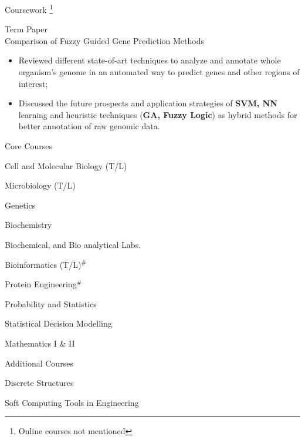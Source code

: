 \documentclass{article}
\newlength{\tabin}
\newlength{\secsep}
\newcommand{\lineunder}{\vspace*{-8pt} \\ \hspace*{-6pt} \hrulefill \\ \vspace*{-15pt}}
\newenvironment{tabbedsection}[1]{
  \begin{list}{}{
      \setlength{\itemsep}{0pt}
      \setlength{\labelsep}{0pt}
      \setlength{\labelwidth}{0pt}
      \setlength{\leftmargin}{\tabin}
      \setlength{\rightmargin}{\tabin}
      \setlength{\listparindent}{0pt}
      \setlength{\parsep}{0pt}
      \setlength{\parskip}{0pt}
      \setlength{\partopsep}{0pt}
      \setlength{\topsep}{#1}
    }
  \item[]
}{\end{list}}
\newenvironment{resume_section}[1]{
  \filbreak
  \vspace{2\secsep}
  \textsc{\large#1}
  \lineunder
  \begin{tabbedsection}{\secsep}
}{\end{tabbedsection}}
\newenvironment{resume_subsection}[2][]{
  \textbf{#2} \hfill {\footnotesize #1} \hspace*{-3.5em}
  \begin{tabbedsection}{0.5\secsep}
}{\end{tabbedsection}}
\newenvironment{subitems}{
  \renewcommand{\labelitemi}{$\cdot$}
  \begin{itemize}
      \setlength{\labelsep}{1em}
}{\end{itemize}}
\begin{document}
\begin{resume_section}{Coursework \footnote{Online courses not mentioned}}
  \begin{resume_subsection}{Term Paper \\ Comparison of Fuzzy Guided Gene Prediction Methods}
    \begin{subitems}
      \item Reviewed different state-of-art techniques to analyze and annotate whole organism's genome in an automated way to predict genes and other regions of interest;
      \item Discussed the future prospects and application strategies of \textbf{SVM, NN} learning and heuristic techniques (\textbf{GA, Fuzzy Logic}) as hybrid methods for better annotation of raw genomic data.\\
    \end{subitems}
    \end{resume_subsection}

\begin{resume_subsection}{Core Courses}
\vspace*{-8pt}
    \begin{subitems}
        \begin{multicols}{2}
        \item Cell and Molecular Biology (T/L)
        \item Microbiology (T/L)
        \item Genetics
        \item Biochemistry
        \item Biochemical, and Bio analytical Labs.
        \item Bioinformatics (T/L)$^{\#}$
        \item Protein Engineering$^{\#}$
        \item Probability and Statistics
        \item Statistical Decision Modelling
        \item Mathematics I \& II
        \end{multicols}
    \end{subitems}
\end{resume_subsection}

\begin{resume_subsection}{Additional Courses}
\vspace*{-8pt}
    \begin{subitems}
        \begin{multicols}{2}
        \item Discrete Structures
        \item Soft Computing Tools in Engineering
        \end{multicols}
    \end{subitems}
\end{resume_subsection}

\end{resume_section}
\end{document}

